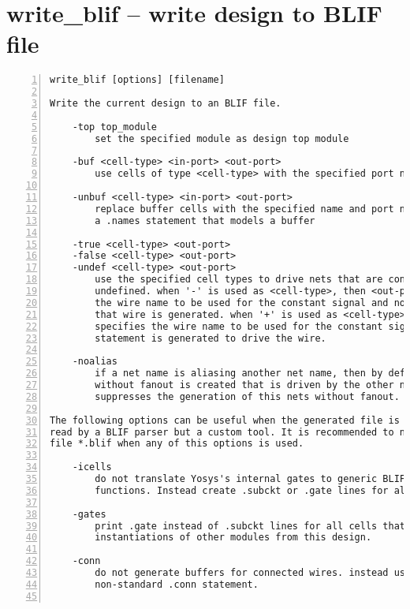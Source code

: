 \section{write\_blif -- write design to BLIF file}
\label{cmd:write_blif}
\begin{lstlisting}[numbers=left,frame=single]
    write_blif [options] [filename]

Write the current design to an BLIF file.

    -top top_module
        set the specified module as design top module

    -buf <cell-type> <in-port> <out-port>
        use cells of type <cell-type> with the specified port names for buffers

    -unbuf <cell-type> <in-port> <out-port>
        replace buffer cells with the specified name and port names with
        a .names statement that models a buffer

    -true <cell-type> <out-port>
    -false <cell-type> <out-port>
    -undef <cell-type> <out-port>
        use the specified cell types to drive nets that are constant 1, 0, or
        undefined. when '-' is used as <cell-type>, then <out-port> specifies
        the wire name to be used for the constant signal and no cell driving
        that wire is generated. when '+' is used as <cell-type>, then <out-port>
        specifies the wire name to be used for the constant signal and a .names
        statement is generated to drive the wire.

    -noalias
        if a net name is aliasing another net name, then by default a net
        without fanout is created that is driven by the other net. This option
        suppresses the generation of this nets without fanout.

The following options can be useful when the generated file is not going to be
read by a BLIF parser but a custom tool. It is recommended to not name the output
file *.blif when any of this options is used.

    -icells
        do not translate Yosys's internal gates to generic BLIF logic
        functions. Instead create .subckt or .gate lines for all cells.

    -gates
        print .gate instead of .subckt lines for all cells that are not
        instantiations of other modules from this design.

    -conn
        do not generate buffers for connected wires. instead use the
        non-standard .conn statement.


\end{lstlisting}
